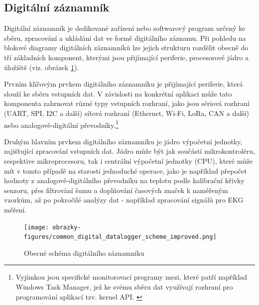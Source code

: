 \subsection{Digitální záznamník}
\label{digitalni_zaznamik}
Digitální záznamník je dedikované zařízení nebo softwarový program určený ke sběru, zpracování a ukládání dat ve formě digitálního záznamu. Při pohledu na blokové diagramy digitálních záznamníků lze jejich strukturu rozdělit obecně do tří základních komponent, kterými jsou přijímající periferie, procesorové jádro a úložiště (viz. obrázek \ref{fig:common-digital-datalogger}). \cite{researchgate_general_dataloggger_multiple_sdcards, ieee_digital_sound_recorder_arm_sd_card, ieee_multi_connectivity_datalogger_sd_card}

Prvním klíčovým prvkem digitálního záznamníku je přijímající periferie, která slouží ke sběru vstupních dat. V závislosti na konkrétní aplikaci může tato komponenta zahrnovat různé typy vstupních rozhraní, jako jsou sériová rozhraní (UART, SPI, I2C a další) síťová rozhraní (Ethernet, Wi-Fi, LoRa, CAN a další) nebo analogově-digitální převodníky.\footnote{Vyjímkou jsou specifické monitorovací programy mezi, které patří například Windows Task Manager, jež ke svému sběru dat využívají rozhraní pro programování aplikací tzv. kernel API. \cite{fourcore_win_process_birth}} \cite{ieee_digital_sound_recorder_arm_sd_card}


Druhým hlavním prvkem digitálního záznamníku je jádro výpočetní jednotky, zajišťující zpracování vstupních dat. Jádro může být jak součástí mikrokontroléru, respektive mikroprocesoru, tak i centrální výpočetní jednotky (CPU), které může mít v tomto případě na starosti jednoduché operace, jako je například přepočet hodnoty z analogově-digitálního převodníku na teplotu podle kalibrační křivky senzoru, přes filtrování šumu a doplňování časových značek k naměřeným vzorkům, až po pokročilé analýzy dat - například zpracování signálů pro EKG měření. \cite{springer_development_ECG_recorder}

\begin{figure}[h]
    \centering
    \texttt{[image: obrazky-figures/common\_digital\_datalogger\_scheme\_improved.png]}
    \caption{Obecné schéma digitálního záznamníku}
    \label{fig:common-digital-datalogger}
\end{figure}

